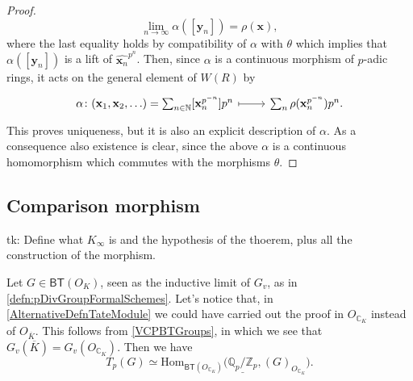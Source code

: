 \begin{proof}
\begin{equation*}
		\lim_{n \to \infty} \alpha([\mathbf{y}_n]) = \rho(\mathbf{x})
	,\end{equation*}
	where the last equality holds by compatibility of $\alpha$ with $\theta$
	which implies that $\alpha([\mathbf{y}_n])$ is a lift of $\widehat{\mathbf{x}_n}^{p^n}$.
	Then, since $\alpha$ is a continuous morphism of $p$-adic rings,
	it acts on the general element of $W(R)$ by
	\begin{equation*}
	\begin{tikzcd}[row sep = 0ex
		,/tikz/column 1/.append style={anchor=base east}
		,/tikz/column 2/.append style={anchor=base west}]
		\alpha\colon 
		(\mathbf{x}_1, \mathbf{x}_2, \ldots) =
		\sum_{n \in \mathbb{N} }^{  } [\mathbf{x}_n^{p^{-n}}] p^n
		\arrow[r, "", mapsto] &
		\sum_{n }^{  } \rho (\mathbf{x}_n^{p^{-n}}) p^n
	.\end{tikzcd}
	\end{equation*} 
	This proves uniqueness, but it is also an explicit description of $\alpha$.
	As a consequence also existence is clear, since the above $\alpha$ is
	a continuous homomorphism which commutes with the morphisms $\theta$.
\end{proof}



\subsection{Comparison morphism}
tk: Define what $K_{\infty}$ is and the hypothesis of the thoerem, plus all the construction
of the morphism.


\begin{rem}[]
	Let $G \in \mathsf{BT}(O_K)$, seen as the inductive limit of $G_v$, 
	as in \cref{defn:pDivGroupFormalSchemes}.
	Let's notice that, in \cref{AlternativeDefnTateModule} we could have
	carried out the proof in $O_{\mathbb{C}_K}$ instead of $O_{\overline{K}}$.
	This follows from \cref{VCPBTGroups}, in which we see that
	$G_v(\overline{K}) = G_v(O_{\mathbb{C}_K})$.
	Then we have
	\begin{equation*}
		T_p(G) \simeq \mathrm{Hom}_{\mathsf{BT}(O_{\mathbb{C}_K})} 
		\big( \underline{\mathbb{Q}_p/\mathbb{Z}_{p}}, (G)_{O_{\mathbb{C}_K}} \big)
	.\end{equation*}
\end{rem}


